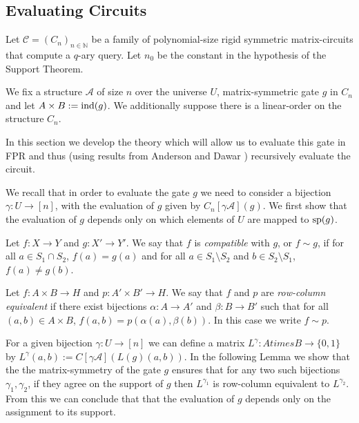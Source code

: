 \documentclass[../paper.tex]{subfiles}
\begin{document}
 \subsection {Evaluating Circuits}
 Let $\mathcal{C} = (C_n)_{n \in \mathbb{N}}$ be a family of polynomial-size
 rigid symmetric matrix-circuits that compute a $q$-ary query. Let $n_0$ be the
 constant in the hypothesis of the Support Theorem.

 We fix a structure $\mathcal{A}$ of size $n$ over the universe $U$,
 matrix-symmetric gate $g$ in $C_n$ and let $A \times B := \text{\upshape ind}(g)$. We
 additionally suppose there is a linear-order on the structure $C_n$.

 In this section we develop the theory which will allow us to evaluate this gate
 in FPR and thus (using results from Anderson and Dawar \cite{AndersonD17})
 recursively evaluate the circuit.

 We recall that in order to evaluate the gate $g$ we need to consider a
 bijection $\gamma: U \rightarrow [n]$, with the evaluation of $g$ given by
 $C_n[\gamma \mathcal{A}](g)$. We first show that the evaluation of $g$ depends
 only on which elements of $U$ are mapped to $\text{sp}(g)$.

\begin{definition}
  Let $f: X \rightarrow Y$ and $g : X' \rightarrow Y'$. We say that $f$ is
  \emph{compatible} with $g$, or $f \sim g$, if for all $a \in S_1 \cap S_2$,
  $f(a) = g(a)$ and for all $a \in S_1 \setminus S_2$ and $b \in S_2 \setminus
  S_1$, $f(a) \neq g(b)$.
\end{definition}

\begin{definition}
  Let $f: A \times B \rightarrow H$ and $p: A' \times B' \rightarrow H$. We say
  that $f$ and $p$ are \emph{row-column equivalent} if there exist bijections
  $\alpha: A \rightarrow A'$ and $\beta: B \rightarrow B'$ such that for all
  $(a, b) \in A \times B$, $f(a,b) = p(\alpha(a), \beta(b))$. In this case we
  write $f \sim p$.
\end{definition}

For a given bijection $\gamma: U \rightarrow [n]$ we can define a matrix
$L^{\gamma} : A times B \rightarrow \{0,1\}$ by $L^{\gamma} (a,b) := C[\gamma
\mathcal{A}](L(g)(a,b))$. In the following Lemma we show that the the
matrix-symmetry of the gate $g$ ensures that for any two such bijections
$\gamma_1, \gamma_2$, if they agree on the support of $g$ then $L^{\gamma_1}$ is
row-column equivalent to $L^{\gamma_2}$. From this we can conclude that that the
evaluation of $g$ depends only on the assignment to its support.
\end{document}
